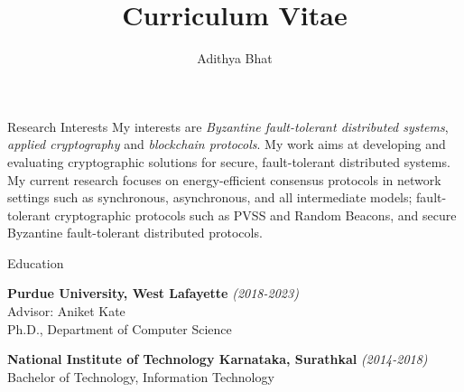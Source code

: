 \documentclass{resume}
\author{Adithya Bhat}
\date{}
\title{Curriculum Vitae}
\begin{document}
\begin{rSection}{Research Interests}
\label{sec:org813ce0b}
My interests are \emph{Byzantine fault-tolerant distributed systems}, \emph{applied cryptography} and \emph{blockchain protocols}.
My work aims at developing and evaluating cryptographic solutions for secure, fault-tolerant distributed systems.
My current research focuses on energy-efficient consensus protocols in network settings such as synchronous, asynchronous, and all intermediate models; fault-tolerant cryptographic protocols such as PVSS and Random Beacons, and secure Byzantine fault-tolerant distributed protocols.
\end{rSection}
\begin{rSection}{Education}
\label{sec:org8d5d741}
 \item  \textbf{Purdue University, West Lafayette}
 \hfill  \emph{(2018-2023)}\\[0pt]
    Advisor: Aniket Kate\\[0pt]
    Ph.D., Department of Computer Science

 \item  \textbf{National Institute of Technology Karnataka, Surathkal}
 \hfill  \emph{(2014-2018)}\\[0pt]
    Bachelor of Technology, Information Technology
\end{rSection}
\end{document}
